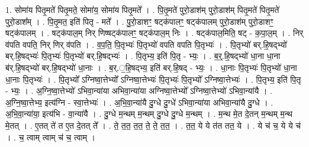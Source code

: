 \documentclass[17pt]{extarticle}
\begin{document}
1. सोमा॑य पितृ॒मते॑ पितृ॒मते॒ सोमा॑य॒ सोमा॑य पितृ॒मते᳚ । . पि॒तृ॒मते॑ पुरो॒डाश॑म् पुरो॒डाश॑म् पितृ॒मते॑ पितृ॒मते॑ पुरो॒डाश᳚म् । . पि॒तृ॒मत॒ इति॑ पितृ - मते᳚ । . पु॒रो॒डाशꣳ॒॒ षट्क॑पालꣳ॒॒ षट्क॑पालम् पुरो॒डाश॑म् पुरो॒डाशꣳ॒॒ षट्क॑पालम् । . षट्क॑पाल॒म् निर् णिष्षट्क॑पालꣳ॒॒ षट्क॑पाल॒म् निः । . षट्क॑पाल॒मिति॒ षट् - क॒पा॒ल॒म् । . निर् व॑पति वपति॒ निर् णिर् व॑पति । . व॒प॒ति॒ पि॒तृभ्यः॑ पि॒तृभ्यो॑ वपति वपति पि॒तृभ्यः॑ । . पि॒तृभ्यो॑ बर्.हि॒षद्भ्यो॑ बर्.हि॒षद्भ्यः॑ पि॒तृभ्यः॑ पि॒तृभ्यो॑ बर्.हि॒षद्भ्यः॑ । . पि॒तृभ्य॒ इति॑ पि॒तृ - भ्यः॒ । . ब॒र्॒.हि॒षद्भ्यो॑ धा॒ना धा॒ना ब॑र्.हि॒षद्भ्यो॑ बर्.हि॒षद्भ्यो॑ धा॒नाः । . ब॒र्.॒हि॒षद्भ्य॒ इति॑ बर्.हि॒षद् - भ्यः॒ । . धा॒नाः पि॒तृभ्यः॑ पि॒तृभ्यो॑ धा॒ना धा॒नाः पि॒तृभ्यः॑ । . पि॒तृभ्यो᳚ ऽग्निष्वा॒त्तेभ्यो᳚ ऽग्निष्वा॒त्तेभ्यः॑ पि॒तृभ्यः॑ पि॒तृभ्यो᳚ ऽग्निष्वा॒त्तेभ्यः॑ । . पि॒तृभ्य॒ इति॑ पि॒तृ - भ्यः॒ । . अ॒ग्नि॒ष्वा॒त्तेभ्यो॑ ऽभिवा॒न्या॑या अभिवा॒न्या॑या अग्निष्वा॒त्तेभ्यो᳚ ऽग्निष्वा॒त्तेभ्यो॑ ऽभिवा॒न्या॑यै । . अ॒ग्नि॒ष्वा॒त्तेभ्य॒ इत्य॑ग्नि - स्वा॒त्तेभ्यः॑ । . अ॒भि॒वा॒न्या॑यै दु॒ग्धे दु॒ग्धे॑ ऽभिवा॒न्या॑या अभिवा॒न्या॑यै दु॒ग्धे । . अ॒भि॒वा॒न्या॑या॒ इत्य॑भि - वा॒न्या॑यै । . दु॒ग्धे म॒न्थम् म॒न्थम् दु॒ग्धे दु॒ग्धे म॒न्थम् । . म॒न्थ मे॒त दे॒तन् म॒न्थम् म॒न्थ मे॒तत् । . ए॒तत् ते॑ त ए॒त दे॒तत् ते᳚ । . ते॒ त॒त॒ त॒त॒ ते॒ ते॒ त॒त॒ । . त॒त॒ ये ये त॑त तत॒ ये । . ये च॑ च॒ ये ये च॑ । . च॒ त्वाम् त्वाम् च॑ च॒ त्वाम् । \newline
\end{document}
